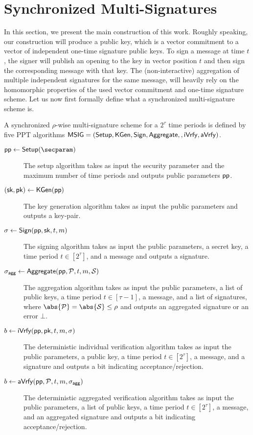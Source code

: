 
\section{Synchronized Multi-Signatures}\label{sec:nidv}

In this section, we present the main construction of this work. 
Roughly speaking, our construction will produce a public key, which is a vector commitment to a vector of independent one-time signature public keys.
To sign a message at time $t$, the signer will publish an opening to the key in vector position $t$ and then sign the corresponding message with that key.
The (non-interactive) aggregation of multiple independent signatures for the same message, will heavily rely on the homomorphic properties of the used vector commitment and one-time signature scheme.
Let us now first formally define what a synchronized multi-signature scheme is.

\begin{definition}\label{def:multisig} A synchronized $\rho$-wise multi-signature scheme for a $2^\tau$ time periods is defined by five PPT algorithms $\mathsf{MSIG}=(\mathsf{Setup}, \mathsf{KGen}, \mathsf{Sign}\allowbreak, \mathsf{Aggregate},\allowbreak, \mathsf{iVrfy}, \mathsf{aVrfy})$.
\begin{description}
  \item[$\params\gets\setup(\secparam)$] The setup algorithm takes as input the security parameter and the maximum number of time periods and outputs public parameters $\mathsf{pp}$.
  \item[$(\mathsf{sk},\mathsf{pk})\gets\mathsf{KGen}(\mathsf{pp})$] The key generation algorithm takes as input the public parameters and outputs a key-pair.
  \item[$\sigma\gets\mathsf{Sign}(\mathsf{pp},\mathsf{sk},t,m)$] The signing algorithm takes as input the public parameters, a secret key, a time period $t\in[2^\tau]$, and a message and outputs a signature.
  \item[$\sigma_\mathsf{agg}\gets\mathsf{Aggregate}(\mathsf{pp},\mathcal{P},t,m,\mathcal{S})$] The aggregation algorithm takes as input the public parameters, a list of public keys, a time period $t\in[\tau-1]$, a message, and a list of signatures, where $\abs{\pubkeys}=\abs{\signatures}\leq\rho$ and outputs an aggregated signature or an error $\bot$.
  \item[$b \gets \mathsf{iVrfy}(\mathsf{pp},\mathsf{pk},t,m,\sigma)$] The deterministic individual verification algorithm takes as input the public parameters, a public key, a time period $t\in[2^\tau]$, a message, and a signature and outputs a bit indicating acceptance/rejection.
  \item[$b \gets \mathsf{aVrfy}(\mathsf{pp},\mathcal{P},t,m,\sigma_\mathsf{agg})$] The deterministic aggregated verification algorithm takes as input the public parameters, a list of public keys, a time period $t\in[2^\tau]$, a message, and an aggregated signature and outputs a bit indicating acceptance/rejection.
\end{description}
\end{definition}

